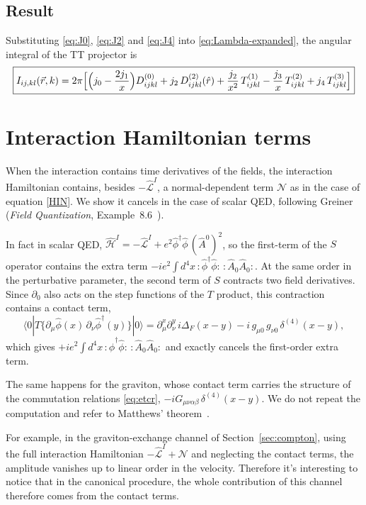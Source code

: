 \documentclass[12pt,a4paper,oneside]{article}
\numberwithin{equation}{section}   %
\begin{document}
\subsection{Result}
Substituting \eqref{eq:J0}, \eqref{eq:J2} and \eqref{eq:J4} into
\eqref{eq:Lambda-expanded}, the angular integral of the TT projector is
\begin{equation}
\boxed{
I_{ij,kl}(\vec r,k)=2\pi\Bigl[\Bigl(j_0-\frac{2j_1}{x}\Bigr)D^{(0)}_{ijkl}
+j_2\,D^{(2)}_{ijkl}(\hat r)
+\frac{j_2}{x^2}\,T^{(1)}_{ijkl}-\frac{j_3}{x}\,T^{(2)}_{ijkl}+j_4\,T^{(3)}_{ijkl}\Bigr]
}
\label{eq:I-result}
\end{equation}


\section{Interaction Hamiltonian terms}
\label{app:normal-terms}

When the interaction contains time derivatives of the fields, the interaction
Hamiltonian contains, besides $-\hat{\mathcal L}^I$, a normal-dependent term
$\mathcal N$ as in the case of equation \eqref{HIN}. 
We show it cancels in the case of scalar QED, following
Greiner (\textit{Field Quantization}, Example~8.6~\cite{GreinerFQ}).

In fact in scalar QED, $\hat{\mathcal H}^I=-\hat{\mathcal L}^I+e^2\hat\phi^\dagger\hat\phi\,(\hat A^0)^2$,
so the first-term of the $S$ operator contains the extra term
$-ie^2\int d^4x\,{:}\hat\phi^\dagger\hat\phi{:}\,{:}\hat A_0\hat A_0{:}$.
At the same order in the perturbative parameter,
the second term of $S$ contracts two field derivatives.
Since $\partial_0$ also acts on the step functions of the $T$ product, this
contraction contains a contact term,
\begin{equation}\label{contact}
\langle0|T\{\partial_\mu\hat\phi(x)\,\partial_\nu\hat\phi^\dagger(y)\}|0\rangle
=\partial^x_\mu\partial^y_\nu\, i\Delta_F(x-y)
-i\,g_{\mu0}\,g_{\nu0}\,\delta^{(4)}(x-y),
\end{equation}
which gives $+ie^2\int d^4x\,{:}\hat\phi^\dagger\hat\phi{:}\,{:}\hat A_0\hat A_0{:}$
and exactly cancels the first-order extra term.

The same happens for the graviton, whose contact term carries the structure
of the commutation relations \eqref{eq:etcr}, $-iG_{\mu\nu\alpha\beta}\,\delta^{(4)}(x-y)$.
We do not repeat the computation and refer to Matthews'
theorem~\cite{Weinberg1995}. 

For example, in the graviton-exchange channel of Section~\ref{sec:compton}, 
using the full interaction Hamiltonian
$-\hat{\mathcal L}^I+\mathcal N$ and neglecting
the contact terms, the amplitude vanishes up to linear order in the
velocity. Therefore it's interesting to notice
that in the canonical procedure, the whole contribution of this channel
therefore comes from the contact terms.
\end{document}

